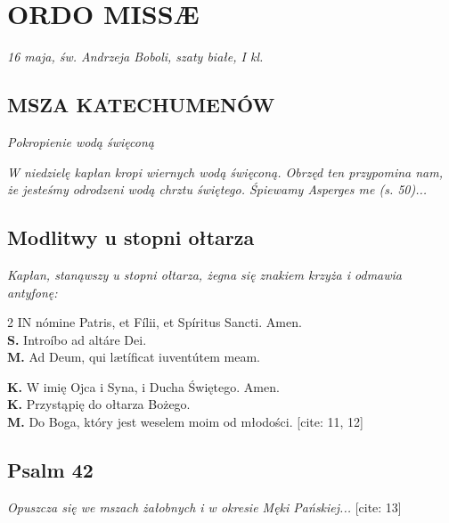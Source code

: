 \documentclass[9pt,twoside]{article}
\newcommand{\rubric}[1]{\textcolor{rubricred}{\textit{#1}}}
\begin{document}
\setcounter{page}{3}
\section*{ORDO MISSÆ}
\begin{center}
    \small \textit{16 maja, św. Andrzeja Boboli, szaty białe, I kl.}
\end{center}

\subsection*{MSZA KATECHUMENÓW}

\begin{center}
    \rubric{Pokropienie wodą święconą}
\end{center}
\noindent \footnotesize \rubric{W niedzielę kapłan kropi wiernych wodą święconą. Obrzęd ten przypomina nam, że jesteśmy odrodzeni wodą chrztu świętego. Śpiewamy Asperges me (s. 50)...}

\vspace{3mm}
\subsection*{Modlitwy u stopni ołtarza}
\noindent \footnotesize \rubric{Kapłan, stanąwszy u stopni ołtarza, żegna się znakiem krzyża i odmawia antyfonę:}

\begin{multicols}{2}
\noindent \lettrine[lines=2,findent=2pt,nindent=0pt]{\textcolor{rubricred}{I}}{N} nómine Patris, et Fílii, et Spíritus Sancti. Amen. \\
\textbf{S.} Introíbo ad altáre Dei. \\
\textbf{M.} Ad Deum, qui lætíficat iuventútem meam.

\columnbreak
{}
\noindent \textbf{K.} W imię Ojca i Syna, i Ducha Świętego. Amen. \\
\textbf{K.} Przystąpię do ołtarza Bożego. \\
\textbf{M.} Do Boga, który jest weselem moim od młodości. [cite: 11, 12]
\end{multicols}

\vspace{-2mm}
\subsection*{Psalm 42}
\noindent \footnotesize \rubric{Opuszcza się we mszach żałobnych i w okresie Męki Pańskiej...} [cite: 13]
\end{document}
